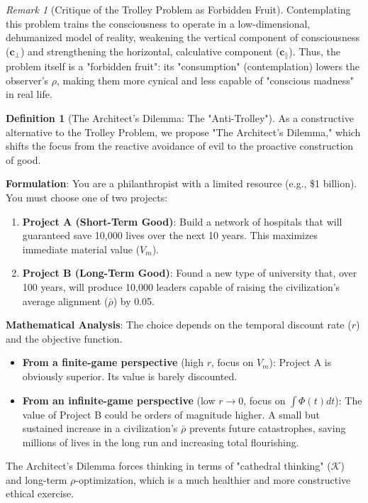 \documentclass[11pt,a4paper]{article}
\theoremstyle{definition}
\newtheorem{definition}{Definition}[section]
\theoremstyle{remark}
\newtheorem{remark}{Remark}[section]
\newcommand{\cc}{\mathbf{c}}
\begin{document}
\begin{enumerate}
\begin{mdframed}[backgroundcolor=green!10,linewidth=2pt,linecolor=green!70!black]
\begin{remark}[Critique of the Trolley Problem as Forbidden Fruit]
Contemplating this problem trains the consciousness to operate in a low-dimensional, dehumanized model of reality, weakening the vertical component of consciousness ($\cc_\perp$) and strengthening the horizontal, calculative component ($\cc_\parallel$). Thus, the problem itself is a "forbidden fruit": its "consumption" (contemplation) lowers the observer's $\rho$, making them more cynical and less capable of "conscious madness" in real life.
\end{remark}

\begin{definition}[The Architect's Dilemma: The "Anti-Trolley"]
As a constructive alternative to the Trolley Problem, we propose "The Architect's Dilemma," which shifts the focus from the reactive avoidance of evil to the proactive construction of good.

\textbf{Formulation}: You are a philanthropist with a limited resource (e.g., \$1 billion). You must choose one of two projects:
\begin{enumerate}
    \item \textbf{Project A (Short-Term Good)}: Build a network of hospitals that will guaranteed save 10,000 lives over the next 10 years. This maximizes immediate material value ($V_m$).
    \item \textbf{Project B (Long-Term Good)}: Found a new type of university that, over 100 years, will produce 10,000 leaders capable of raising the civilization's average alignment ($\bar{\rho}$) by 0.05.
\end{enumerate}

\textbf{Mathematical Analysis}: The choice depends on the temporal discount rate ($r$) and the objective function.
\begin{itemize}
    \item \textbf{From a finite-game perspective} (high $r$, focus on $V_m$): Project A is obviously superior. Its value is barely discounted.
    \item \textbf{From an infinite-game perspective} (low $r \to 0$, focus on $\int \Phi(t) dt$): The value of Project B could be orders of magnitude higher. A small but sustained increase in a civilization's $\bar{\rho}$ prevents future catastrophes, saving millions of lives in the long run and increasing total flourishing.
\end{itemize}
The Architect's Dilemma forces thinking in terms of "cathedral thinking" ($\mathcal{K}$) and long-term $\rho$-optimization, which is a much healthier and more constructive ethical exercise.
\end{definition}


\end{mdframed}
\end{enumerate}
\end{document}
